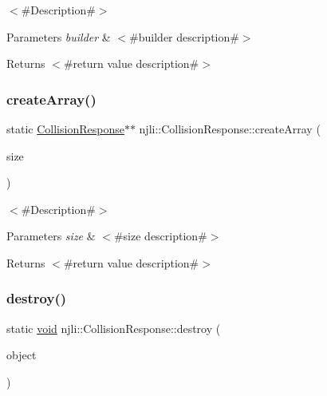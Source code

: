 $<$\#\+Description\#$>$


\begin{DoxyParams}{Parameters}
{\em builder} & $<$\#builder description\#$>$\\
\hline
\end{DoxyParams}
\begin{DoxyReturn}{Returns}
$<$\#return value description\#$>$ 
\end{DoxyReturn}
\mbox{\label{classnjli_1_1_collision_response_ad8ba8d9462d45a5b47b0aa35c1e300ee}} 
\subsubsection{\texorpdfstring{create\+Array()}{createArray()}}
{\footnotesize\ttfamily static \mbox{\hyperlink{classnjli_1_1_collision_response}{Collision\+Response}}$\ast$$\ast$ njli\+::\+Collision\+Response\+::create\+Array (\begin{DoxyParamCaption}\item[{const \mbox{\hyperlink{_util_8h_a10e94b422ef0c20dcdec20d31a1f5049}{u32}}}]{size }\end{DoxyParamCaption})\hspace{0.3cm}{\ttfamily [static]}}

$<$\#\+Description\#$>$


\begin{DoxyParams}{Parameters}
{\em size} & $<$\#size description\#$>$\\
\hline
\end{DoxyParams}
\begin{DoxyReturn}{Returns}
$<$\#return value description\#$>$ 
\end{DoxyReturn}
\mbox{\label{classnjli_1_1_collision_response_af3b0b079eb2acd51fbf4c98be372d0c6}} 
\subsubsection{\texorpdfstring{destroy()}{destroy()}}
{\footnotesize\ttfamily static \mbox{\hyperlink{_thread_8h_af1e856da2e658414cb2456cb6f7ebc66}{void}} njli\+::\+Collision\+Response\+::destroy (\begin{DoxyParamCaption}\item[{\mbox{\hyperlink{classnjli_1_1_collision_response}{Collision\+Response}} $\ast$}]{object }\end{DoxyParamCaption})\hspace{0.3cm}{\ttfamily [static]}}

